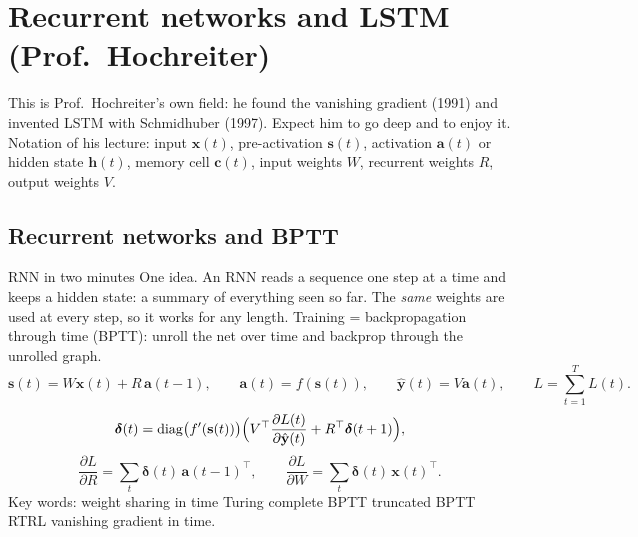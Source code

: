 \section{Recurrent networks and LSTM (Prof.\ Hochreiter)}

This is Prof.\ Hochreiter's own field: he found the vanishing gradient (1991) and invented LSTM
with Schmidhuber (1997). Expect him to go deep and to enjoy it. Notation of his lecture: input
$\mathbf{x}(t)$, pre-activation $\mathbf{s}(t)$, activation $\mathbf{a}(t)$ or hidden state
$\mathbf{h}(t)$, memory cell $\mathbf{c}(t)$, input weights $W$, recurrent weights $R$, output
weights $V$.

\subsection{Recurrent networks and BPTT}

\begin{summary}{RNN in two minutes}
\textsf{One idea.} An RNN reads a sequence one step at a time and keeps a hidden state: a summary
of everything seen so far. The \emph{same} weights are used at every step, so it works for any
length. Training = backpropagation through time (BPTT): unroll the net over time and backprop
through the unrolled graph.
\[
\mathbf{s}(t)=W\mathbf{x}(t)+R\,\mathbf{a}(t-1),\qquad \mathbf{a}(t)=f(\mathbf{s}(t)),\qquad
\hat{\mathbf{y}}(t)=V\mathbf{a}(t),\qquad L=\sum_{t=1}^{T}L(t).
\]
\[
\bm\delta(t)=\mathrm{diag}\bigl(f'(\mathbf{s}(t))\bigr)\Bigl(V^\top\frac{\partial L(t)}{\partial\hat{\mathbf{y}}(t)}+R^\top\bm\delta(t+1)\Bigr),
\]
\[
\frac{\partial L}{\partial R}=\sum_t\bm\delta(t)\,\mathbf{a}(t-1)^\top,\qquad
\frac{\partial L}{\partial W}=\sum_t\bm\delta(t)\,\mathbf{x}(t)^\top.
\]
\textsf{Key words:} weight sharing in time \textbullet{} Turing complete \textbullet{} BPTT
\textbullet{} truncated BPTT \textbullet{} RTRL \textbullet{} vanishing gradient in time.
\end{summary}



